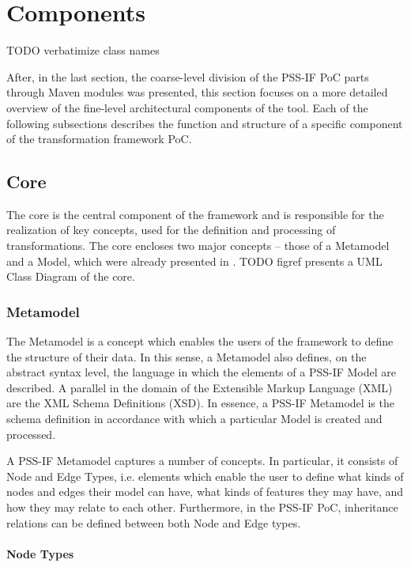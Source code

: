 \section{Components}
\label{sec:impl:components}

\color{red} TODO verbatimize class names \color{black}

After, in the last section, the coarse-level division of the PSS-IF PoC parts through Maven modules was presented, this section focuses on a more detailed overview of the fine-level architectural components of the tool. Each of the following subsections describes the function and structure of a specific component of the transformation framework PoC.

\subsection{Core}

The core is the central component of the framework and is responsible for the realization of key concepts, used for the definition and processing of transformations. The core encloses two major concepts -- those of a Metamodel and a Model, which were already presented in . \color{red}TODO figref\color{black} presents a UML Class Diagram of the core.

\subsubsection{Metamodel}

The Metamodel is a concept which enables the users of the framework to define the structure of their data. In this sense, a Metamodel also defines, on the abstract syntax level, the language in which the elements of a PSS-IF Model are described. A parallel in the domain of the Extensible Markup Language (XML) are the XML Schema Definitions (XSD). In essence, a PSS-IF Metamodel is the schema definition in accordance with which a particular Model is created and processed.

A PSS-IF Metamodel captures a number of concepts. In particular, it consists of Node and Edge Types, i.e. elements which enable the user to define what kinds of nodes and edges their model can have, what kinds of features they may have, and how they may relate to each other. Furthermore, in the PSS-IF PoC, inheritance relations can be defined between both Node and Edge types.

\paragraph{Node Types}

